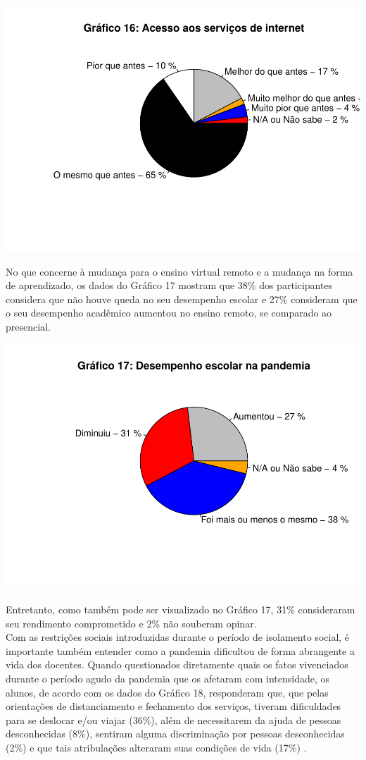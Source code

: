 \documentclass[
]{article}
\begin{document}
\includegraphics{consequencias-oriundas-da-pandemia-v1.0_files/figure-latex/grafico-16-1.pdf}

No que concerne à mudança para o ensino virtual remoto e a mudança na
forma de aprendizado, os dados do Gráfico 17 mostram que 38\% dos
participantes considera que não houve queda no seu desempenho escolar e
27\% consideram que o seu desempenho acadêmico aumentou no ensino
remoto, se comparado ao presencial.

\includegraphics{consequencias-oriundas-da-pandemia-v1.0_files/figure-latex/grafico-30-1.pdf}

Entretanto, como também pode ser visualizado no Gráfico 17, 31\%
consideraram seu rendimento comprometido e 2\% não souberam opinar.\\
Com as restrições sociais introduzidas durante o período de isolamento
social, é importante também entender como a pandemia dificultou de forma
abrangente a vida dos docentes. Quando questionados diretamente quais os
fatos vivenciados durante o período agudo da pandemia que os afetaram
com intensidade, os alunos, de acordo com os dados do Gráfico 18,
responderam que, que pelas orientações de distanciamento e fechamento
dos serviços, tiveram dificuldades para se deslocar e/ou viajar (36\%),
além de necessitarem da ajuda de pessoas desconhecidas (8\%), sentiram
alguma discriminação por pessoas desconhecidas (2\%) e que tais
atribulações alteraram suas condições de vida (17\%) .
\end{document}
